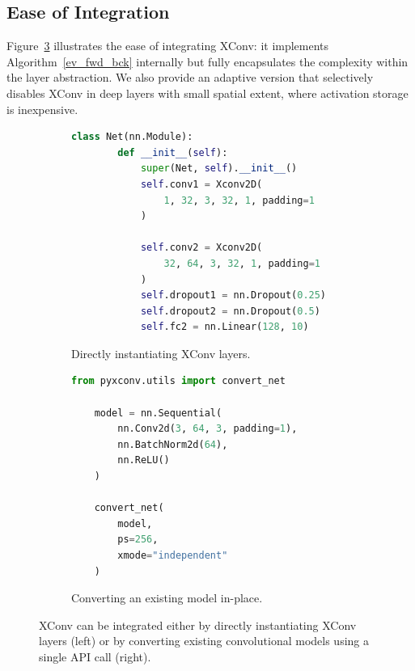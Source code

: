 \documentclass[10pt]{article}
\begin{document}
\subsection{Ease of Integration}
\label{subsec:ease_integ}

Figure~\ref{fig:code_example} illustrates the ease of integrating XConv: it implements Algorithm~\ref{ev_fwd_bck} internally but fully encapsulates the complexity within the layer abstraction. We also provide an adaptive version that selectively disables XConv in deep layers with small spatial extent, where activation storage is inexpensive.

\begin{figure}[t]
    \centering
    \begin{subfigure}[t]{0.48\linewidth}
    \centering
    \caption{Directly instantiating XConv layers.}
    \begin{lstlisting}[language=Python]
    class Net(nn.Module):
        def __init__(self):
            super(Net, self).__init__()
            self.conv1 = Xconv2D(
                1, 32, 3, 32, 1, padding=1
            )

            self.conv2 = Xconv2D(
                32, 64, 3, 32, 1, padding=1
            )
            self.dropout1 = nn.Dropout(0.25)
            self.dropout2 = nn.Dropout(0.5)
            self.fc2 = nn.Linear(128, 10)
    \end{lstlisting}
    \label{subfig:xconv_define}
    \end{subfigure}
    \hfill
    \begin{subfigure}[t]{0.48\linewidth}
    \centering
    \caption{Converting an existing model in-place.}
    \begin{lstlisting}[language=Python]
    from pyxconv.utils import convert_net

    model = nn.Sequential(
        nn.Conv2d(3, 64, 3, padding=1),
        nn.BatchNorm2d(64),
        nn.ReLU()
    )

    convert_net(
        model,
        ps=256,
        xmode="independent"
    )

    \end{lstlisting}
    \label{subfig:xconv_convert}
    \end{subfigure}
    \caption{XConv can be integrated either by directly instantiating XConv layers (left) or by converting existing convolutional models using a single API call (right).}
    \label{fig:code_example}
\end{figure}
\end{document}
